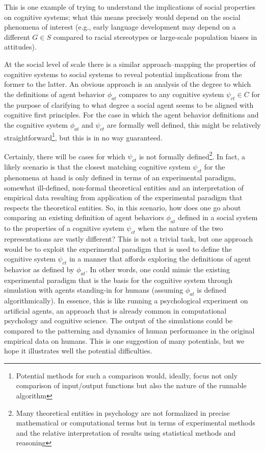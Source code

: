 \documentclass{article}
\begin{document}
This is one example of trying to understand the implications of social properties on cognitive systems; what this means precisely would depend on the social phenomena of interest (e.g., early language development may depend on a different $G \in S$ compared to racial stereotypes or large-scale population biases in attitudes).  

At the social level of scale there is a similar approach--mapping the properties of cognitive systems to social systems to reveal potential implications from the former to the latter.  An obvious approach is an analysis of the degree to which the definitions of agent behavior $\phi_{at}$ compares to any cognitive system $\psi_{ct} \in C$ for the purpose of clarifying to what degree a social agent seems to be aligned with cognitive first principles.  For the case in which the agent behavior definitions and the cognitive system $\phi_{at}$ and $\psi_{ct}$ are formally well defined, this might be relatively straightforward\footnote{Potential methods for such a comparison would, ideally, focus not only comparison of input/output functions but also the nature of the runnable algorithm}, but this is in no way guaranteed. 

Certainly, there will be cases for which $\psi_{ct}$ is not formally defined\footnote{Many theoretical entities in psychology are not formalized in precise mathematical or computational terms but in terms of experimental methods and the relative interpretation of results using statistical methods and reasoning}.  In fact, a likely scenario is that the closest matching cognitive system $\psi_{ct}$ for the phenomena at hand is only defined in terms of an experimental paradigm, somewhat ill-defined, non-formal theoretical entities and an interpretation of empirical data resulting from application of the experimental paradigm that respects the theoretical entities.  So, in this scenario, how does one go about comparing an existing definition of agent behaviors $\phi_{at}$ defined in a social system to the properties of a cognitive system $\psi_{ct}$ when the nature of the two representations are vastly different?  This is not a trivial task, but one approach would be to exploit the experimental paradigm that is used to define the cognitive system $\psi_{ct}$ in a manner that affords exploring the definitions of agent behavior as defined by $\phi_{at}$.  In other words, one could mimic the existing experimental paradigm that is the basis for the cognitive system through simulation with agents standing-in for humans (assuming $\phi_{at}$ is defined algorithmically).  In essence, this is like running a psychological experiment on artificial agents, an approach that is already common in computational psychology and cognitive science.  The output of the simulations could be compared to the patterning and dynamics of human performance in the original  empirical data on humans.  This is one suggestion of many potentials, but we hope it illustrates well the potential difficulties.  
\end{document}
